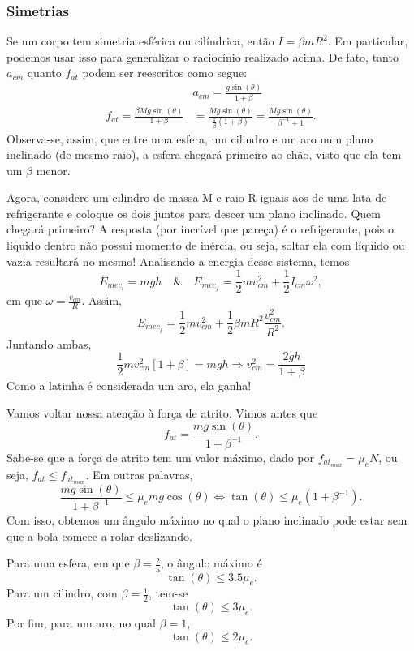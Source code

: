 \documentclass[PhysicsII/physicsII_notes.tex]{subfiles}
\begin{document}
\subsubsection{Simetrias}
Se um corpo tem simetria esférica ou cilíndrica, então \(I = \beta mR^{2}\). Em particular, podemos usar isso para
generalizar o raciocínio realizado acima. De fato, tanto \(a_{cm}\) quanto \(f_{at}\) podem ser reescritos como segue:
\begin{align*}
	                                                  & a_{cm} = \frac{g\sin{(\theta )}}{1+\beta }                                                       \\
	f_{at} = \frac{\beta Mg\sin{(\theta )}}{1+\beta } & = \frac{Mg\sin{(\theta )}}{\frac{1}{\beta }(1+\beta )} = \frac{Mg\sin{(\theta )}}{\beta^{-1}+1}.
\end{align*}
Observa-se, assim, que entre uma esfera, um cilindro e um aro num plano inclinado (de mesmo raio), a esfera chegará primeiro ao chão,
visto que ela tem um \(\beta \) menor.

Agora, considere um cilindro de massa M e raio R iguais aos de uma lata de refrigerante e coloque os dois juntos para descer um plano inclinado. Quem chegará primeiro?
A resposta (por incrível que pareça) é o refrigerante, pois o liquido dentro não possui momento de inércia, ou seja, soltar ela com líquido ou vazia resultará no mesmo! Analisando a energia
desse sistema, temos
\[
	E_{mec_{i}} = mgh\quad \&\quad E_{mec_{f}} = \frac{1}{2}mv_{cm}^{2} + \frac{1}{2}I_{cm}\omega^{2},
\]
em que \(\omega = \frac{v_{cm}}{R}\). Assim,
\[
	E_{mec_{f}}=\frac{1}{2}mv_{cm}^{2} + \frac{1}{2}\beta mR^{2}\frac{v_{cm}^{2}}{R^{2}}.
\]
Juntando ambas,
\[
	\frac{1}{2}mv_{cm}^{2}[1+\beta ] = mgh \Rightarrow v_{cm}^{2} = \frac{2gh}{1+\beta }
\]
Como a latinha é considerada um aro, ela ganha!

Vamos voltar nossa atenção à força de atrito. Vimos antes que
\[
	f_{at} = \frac{mg\sin{(\theta )}}{1 + \beta^{-1}}.
\]
Sabe-se que a força de atrito tem um valor máximo, dado por \(f_{at_{max}} = \mu_{e}N\), ou seja,
\(f_{at}\leq f_{at_{max}}\). Em outras palavras,
\[
	\frac{mg\sin{(\theta )}}{1+\beta^{-1}}\leq \mu_{e}mg\cos{(\theta )} \Longleftrightarrow \tan{(\theta )}\leq \mu_{e}(1+\beta^{-1}).
\]
Com isso, obtemos um ângulo máximo no qual o plano inclinado pode estar sem que a bola comece a rolar deslizando.
\begin{example}
	Para uma esfera, em que \(\beta =\frac{2}{5}\), o ângulo máximo é
	\[
		\tan{(\theta )}\leq 3.5\mu_{e}.
	\]
	Para um cilindro, com \(\beta = \frac{1}{2}\), tem-se
	\[
		\tan{(\theta )}\leq 3\mu_{e}.
	\]
	Por fim, para um aro, no qual \(\beta =1\),
	\[
		\tan{(\theta )}\leq 2\mu_{e}.
	\]
\end{example}
\end{document}
